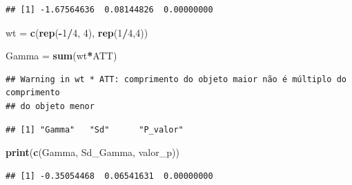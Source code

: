 \documentclass[
]{article}
\newenvironment{Shaded}{\begin{snugshade}}{\end{snugshade}}
\newcommand{\AttributeTok}[1]{\textcolor[rgb]{0.13,0.29,0.53}{#1}}
\newcommand{\CommentTok}[1]{\textcolor[rgb]{0.56,0.35,0.01}{\textit{#1}}}
\newcommand{\ConstantTok}[1]{\textcolor[rgb]{0.56,0.35,0.01}{#1}}
\newcommand{\DecValTok}[1]{\textcolor[rgb]{0.00,0.00,0.81}{#1}}
\newcommand{\FunctionTok}[1]{\textcolor[rgb]{0.13,0.29,0.53}{\textbf{#1}}}
\newcommand{\NormalTok}[1]{#1}
\newcommand{\OtherTok}[1]{\textcolor[rgb]{0.56,0.35,0.01}{#1}}
\newcommand{\SpecialCharTok}[1]{\textcolor[rgb]{0.81,0.36,0.00}{\textbf{#1}}}
\newcommand{\StringTok}[1]{\textcolor[rgb]{0.31,0.60,0.02}{#1}}
\begin{document}
\begin{verbatim}
## [1] -1.67564636  0.08144826  0.00000000
\end{verbatim}

\begin{Shaded}
\begin{Highlighting}[]
\NormalTok{wt }\OtherTok{=} \FunctionTok{c}\NormalTok{(}\FunctionTok{rep}\NormalTok{(}\SpecialCharTok{{-}}\DecValTok{1}\SpecialCharTok{/}\DecValTok{4}\NormalTok{, }\DecValTok{4}\NormalTok{), }\FunctionTok{rep}\NormalTok{(}\DecValTok{1}\SpecialCharTok{/}\DecValTok{4}\NormalTok{,}\DecValTok{4}\NormalTok{))}

\NormalTok{Gamma }\OtherTok{=} \FunctionTok{sum}\NormalTok{(wt}\SpecialCharTok{*}\NormalTok{ATT)}
\end{Highlighting}
\end{Shaded}

\begin{verbatim}
## Warning in wt * ATT: comprimento do objeto maior não é múltiplo do comprimento
## do objeto menor
\end{verbatim}

\begin{Shaded}
\end{Shaded}

\begin{verbatim}
## [1] "Gamma"   "Sd"      "P_valor"
\end{verbatim}

\begin{Shaded}
\begin{Highlighting}[]
\FunctionTok{print}\NormalTok{(}\FunctionTok{c}\NormalTok{(Gamma, Sd\_Gamma, valor\_p))}
\end{Highlighting}
\end{Shaded}

\begin{verbatim}
## [1] -0.35054468  0.06541631  0.00000000
\end{verbatim}
\end{document}
